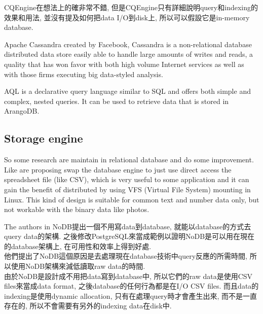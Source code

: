 CQEngine在想法上的確非常不錯, 但是CQEngine只有詳細說明query和indexing的效果和用法, 並沒有提及如何把data I/O到disk上, 所以可以假設它是in-memory database.

\clearpage

\medskip
Apache Cassandra created by Facebook, Cassandra is a non-relational database distributed data store easily able to handle large amounts of writes and reads, a quality that has won favor with both high volume Internet services as well as with those firms executing big data-styled analysis.\\

\clearpage

\medskip
AQL is a declarative query language similar to SQL and offers both simple and complex, nested queries. It can be used to retrieve data that is stored in ArangoDB.\\

\clearpage

\subsection{Storage engine}

So some research are maintain in relational database and do some improvement. Like \cite{paper:nodb,paper:spreadsheet-engine} are proposing swap the database engine to just use direct access the spreadsheet file (like CSV), which is very useful to some application and it can gain the benefit of distributed by using VFS (Virtual File System) mounting in Linux. This kind of design is suitable for common text and number data only, but not workable with the binary data like photos.

\medskip
The authors in NoDB提出一個不用寫data到database, 就能以database的方式去query data的架構. 之後修改PostgreSQL來當成範例以證明NoDB是可以用在現在的database架構上, 在可用性和效率上得到好處.\\

他們提出了NoDB這個原因是去處理現在database技術中query反應的所需時間, 所以使用NoDB架構來減低讀取raw data的時間.\\

由於NoDB是設計成不用把data寫到database中, 所以它們的raw data是使用CSV files來當成data format, 之後database的任何行為都是在I/O CSV files. 而且data的indexing是使用dynamic allocation, 只有在處理query時才會產生出來, 而不是一直存在的, 所以不會需要有另外的indexing data在disk中.\\

